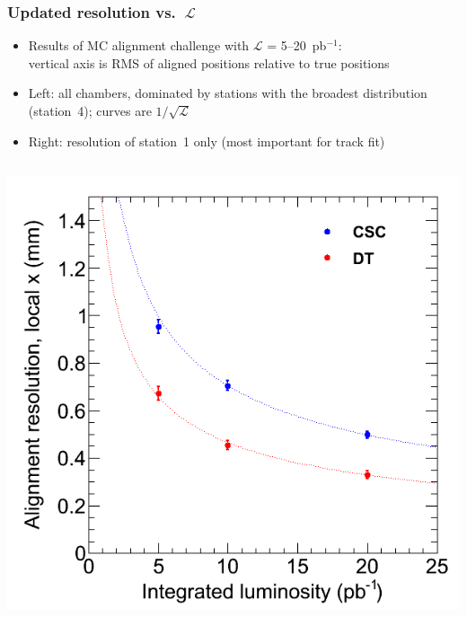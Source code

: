 \documentclass[compress]{beamer}
\begin{document}
\begin{frame}
\frametitle{Updated resolution vs.\ $\mathcal{L}$}

\begin{itemize}
\item Results of MC alignment challenge with $\mathcal{L}$ = 5--20~pb$^{-1}$: \\ vertical
  axis is RMS of aligned positions relative to true positions
\item Left: all chambers, dominated by stations with the broadest
  distribution (station~4); curves are $1/\sqrt{\mathcal{L}}$
\item Right: resolution of station~1 only (most important for track fit)
\end{itemize}

\begin{columns}
\includegraphics[width=\linewidth]{general_alignment_resolution.png}

\end{columns}
\end{frame}
\end{document}
